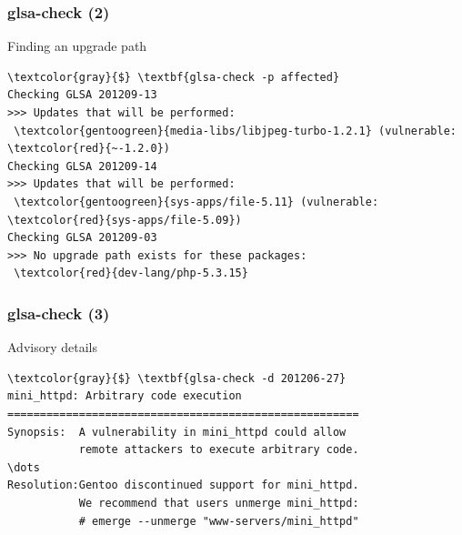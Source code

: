 \documentclass[svgnames]{beamer}
\begin{document}
\begin{frame}[fragile]
  \frametitle{glsa-check (2)}
  
  \begin{block}{Finding an upgrade path}
    \begin{Verbatim}[commandchars=\\\{\}]
\textcolor{gray}{$} \textbf{glsa-check -p affected}
Checking GLSA 201209-13
>>> Updates that will be performed:
 \textcolor{gentoogreen}{media-libs/libjpeg-turbo-1.2.1} (vulnerable: \textcolor{red}{~-1.2.0})
Checking GLSA 201209-14
>>> Updates that will be performed:
 \textcolor{gentoogreen}{sys-apps/file-5.11} (vulnerable: \textcolor{red}{sys-apps/file-5.09})
Checking GLSA 201209-03
>>> No upgrade path exists for these packages:
 \textcolor{red}{dev-lang/php-5.3.15}
    \end{Verbatim}
  \end{block}
\end{frame}

\begin{frame}[fragile]
  \frametitle{glsa-check (3)}
  \begin{block}{Advisory details}
    \begin{Verbatim}[commandchars=\\\{\}]
\textcolor{gray}{$} \textbf{glsa-check -d 201206-27}
mini_httpd: Arbitrary code execution            
======================================================
Synopsis:  A vulnerability in mini_httpd could allow
           remote attackers to execute arbitrary code.
\dots
Resolution:Gentoo discontinued support for mini_httpd.
           We recommend that users unmerge mini_httpd:
           # emerge --unmerge "www-servers/mini_httpd"
    \end{Verbatim}
  \end{block}
\end{frame}
\end{document}
